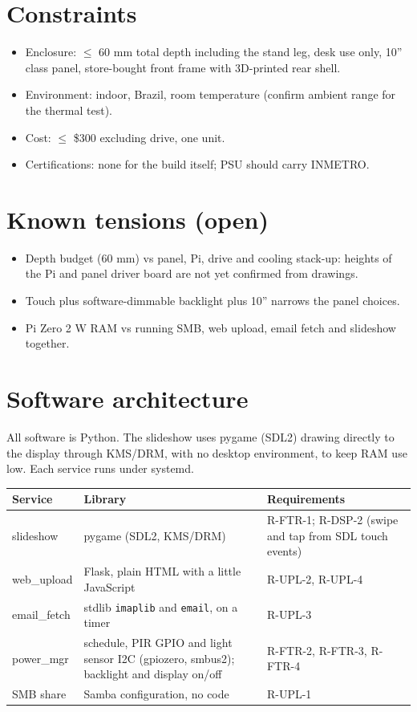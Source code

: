 \documentclass[11pt,a4paper]{article}
\begin{document}
\section{Constraints}
\begin{itemize}
  \item Enclosure: $\le$ 60 mm total depth including the stand leg, desk use only, 10'' class panel, store-bought front frame with 3D-printed rear shell.
  \item Environment: indoor, Brazil, room temperature (confirm ambient range for the thermal test).
  \item Cost: $\le$ \$300 excluding drive, one unit.
  \item Certifications: none for the build itself; PSU should carry INMETRO.
\end{itemize}

\section{Known tensions (open)}
\begin{itemize}
  \item Depth budget (60 mm) vs panel, Pi, drive and cooling stack-up: heights of the Pi and panel driver board are not yet confirmed from drawings.
  \item Touch plus software-dimmable backlight plus 10'' narrows the panel choices.
  \item Pi Zero 2 W RAM vs running SMB, web upload, email fetch and slideshow together.
\end{itemize}

\section{Software architecture}
All software is Python. The slideshow uses pygame (SDL2) drawing directly to the display through KMS/DRM, with no desktop environment, to keep RAM use low. Each service runs under systemd.

\begin{longtable}{l p{4.6cm} p{4.6cm}}
\toprule
\textbf{Service} & \textbf{Library} & \textbf{Requirements} \\
\midrule\endhead
slideshow & pygame (SDL2, KMS/DRM) & R-FTR-1; R-DSP-2 (swipe and tap from SDL touch events) \\
web\_upload & Flask, plain HTML with a little JavaScript & R-UPL-2, R-UPL-4 \\
email\_fetch & stdlib \texttt{imaplib} and \texttt{email}, on a timer & R-UPL-3 \\
power\_mgr & schedule, PIR GPIO and light sensor I2C (gpiozero, smbus2); backlight and display on/off & R-FTR-2, R-FTR-3, R-FTR-4 \\
SMB share & Samba configuration, no code & R-UPL-1 \\
\bottomrule
\end{longtable}
\end{document}
